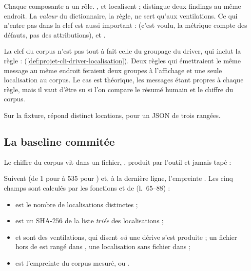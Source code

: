 
Chaque composante a un rôle. ,  et  localisent ;  distingue deux findings au même endroit. La \emph{valeur} du dictionnaire, la règle, ne sert qu'aux ventilations. Ce qui n'entre pas dans la clef est aussi important :  (c'est voulu, la métrique compte des défauts, pas des attributions),  et .

\begin{remarque}
La clef du corpus n'est pas tout à fait celle du groupage du driver, qui inclut la règle :  (\cref{def:projet-cli-driver-localisation}). Deux règles qui émettraient le même message au même endroit feraient deux groupes à l'affichage et une seule localisation au corpus. Le cas est théorique, les messages étant propres à chaque règle, mais il vaut d'être su si l'on compare le résumé humain et le chiffre du corpus.
\end{remarque}

Sur la fixture,  répond  distinct locations\fg{}, pour un JSON de trois rangées.

\subsection{La baseline commitée}

Le chiffre du corpus vit dans un fichier, , produit par l'outil et jamais tapé :


Suivent  (de 1 pour  à 535 pour ) et, à la dernière ligne, l'empreinte . Les cinq champs sont calculés par les fonctions  et  de  (l.~65--88) :

\begin{itemize}
  \item {} est le nombre de localisations distinctes ;
  \item {} est un SHA-256 de la liste \emph{triée} des localisations ;
  \item {} et  sont des ventilations, qui disent \emph{où} une dérive s'est produite ; un fichier hors de  est rangé dans , une localisation sans fichier dans  ;
  \item {} est l'empreinte du corpus mesuré, ou .
\end{itemize}

